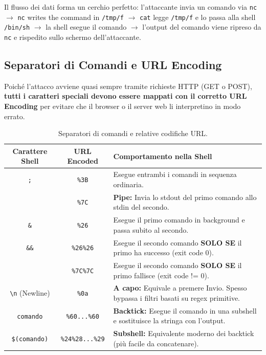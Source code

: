 \documentclass[12pt,a4paper]{report}
\begin{document}
	\begin{tcolorbox}[colback=white, colframe=black, title=\textbf{Meccanismo a Ciclo Continuo (Anello)}]
		Il flusso dei dati forma un cerchio perfetto: l'attaccante invia un comando via \texttt{nc} $\rightarrow$ \texttt{nc} writes the command in \texttt{/tmp/f} $\rightarrow$ \texttt{cat} legge \texttt{/tmp/f} e lo passa alla shell \texttt{/bin/sh} $\rightarrow$ la shell esegue il comando $\rightarrow$ l'output del comando viene ripreso da \texttt{nc} e rispedito sullo schermo dell'attaccante.
	\end{tcolorbox}
	
	\subsection{Separatori di Comandi e URL Encoding}
	
	Poiché l'attacco avviene quasi sempre tramite richieste HTTP (GET o POST), \textbf{tutti i caratteri speciali devono essere mappati con il corretto URL Encoding} per evitare che il browser o il server web li interpretino in modo errato.
	
	\begin{table}[h!]
		\centering
		\begin{tabular}{|c|c|p{9cm}|}
			\hline
			\textbf{Carattere Shell} & \textbf{URL Encoded} & \textbf{Comportamento nella Shell} \\ \hline
			\texttt{;} & \texttt{\%3B} & Esegue entrambi i comandi in sequenza ordinaria. \\ \hline
			\texttt{\textbar} & \texttt{\%7C} & \textbf{Pipe:} Invia lo stdout del primo comando allo stdin del secondo. \\ \hline
			\texttt{\&} & \texttt{\%26} & Esegue il primo comando in background e passa subito al secondo. \\ \hline
			\texttt{\&\&} & \texttt{\%26\%26} & Esegue il secondo comando \textbf{SOLO SE} il primo ha successo (exit code 0). \\ \hline
			\texttt{\textbar\textbar} & \texttt{\%7C\%7C} & Esegue il secondo comando \textbf{SOLO SE} il primo fallisce (exit code != 0). \\ \hline
			\texttt{\textbackslash n} (Newline) & \texttt{\%0a} & \textbf{A capo:} Equivale a premere Invio. Spesso bypassa i filtri basati su regex primitive. \\ \hline
			\texttt{\textasciigrave{}comando\textasciigrave{}} & \texttt{\%60...\%60} & \textbf{Backtick:} Esegue il comando in una subshell e sostituisce la stringa con l'output. \\ \hline
			\texttt{\$(comando)} & \texttt{\%24\%28...\%29} & \textbf{Subshell:} Equivalente moderno dei backtick (più facile da concatenare). \\ \hline
		\end{tabular}
		\caption{Separatori di comandi e relative codifiche URL.}
	\end{table}
	
\end{document}
